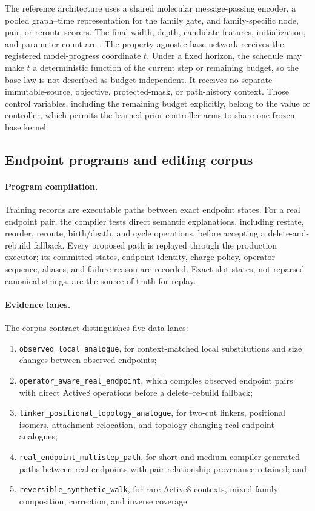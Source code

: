 The reference architecture uses a shared molecular message-passing encoder,
a pooled graph--time representation for the family gate, and family-specific
node, pair, or reroute scorers. The final width, depth, candidate features,
initialization, and parameter count are
. The property-agnostic base
network receives the registered model-progress coordinate $t$. Under a fixed
horizon, the schedule may make $t$ a deterministic function of the current
step or remaining budget, so the base law is not described as budget
independent. It receives no separate immutable-source, objective, protected-mask,
or path-history context. Those control variables, including the remaining
budget explicitly, belong to the value or controller, which permits the
learned-prior controller arms to share one frozen base kernel.

\subsection{Endpoint programs and editing corpus}
\label{sec:editing-corpus}

\paragraph{Program compilation.}
Training records are executable paths between exact endpoint states. For a real
endpoint pair, the compiler tests direct semantic explanations, including
restate, reorder, reroute, birth/death, and cycle operations, before accepting a
delete-and-rebuild fallback. Every proposed path is replayed through the
production executor; its committed states, endpoint identity, charge policy,
operator sequence, aliases, and failure reason are recorded. Exact slot states,
not reparsed canonical strings, are the source of truth for replay.

\paragraph{Evidence lanes.}
The corpus contract distinguishes five data lanes:

\begin{enumerate}
  \item \texttt{observed\_local\_analogue}, for context-matched local
  substitutions and size changes between observed endpoints;
  \item \texttt{operator\_aware\_real\_endpoint}, which compiles observed
  endpoint pairs with direct Active8 operations before a delete--rebuild
  fallback;
  \item \texttt{linker\_positional\_topology\_analogue}, for two-cut linkers,
  positional isomers, attachment relocation, and topology-changing
  real-endpoint analogues;
  \item \texttt{real\_endpoint\_multistep\_path}, for short and medium
  compiler-generated paths between real endpoints with pair-relationship
  provenance retained; and
  \item \texttt{reversible\_synthetic\_walk}, for rare Active8 contexts,
  mixed-family composition, correction, and inverse coverage.
\end{enumerate}


